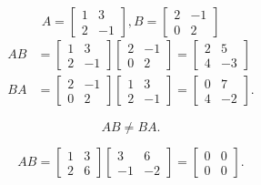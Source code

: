 \documentclass{article}
\begin{document}
\begin{example}
    \[
        A =
        \begin{bmatrix}
            1&3\\
            2&-1
        \end{bmatrix},
        B =
        \begin{bmatrix}
            2&-1\\
            0&2
        \end{bmatrix}
    \] 
    \begin{align*}
        AB &= 
        \begin{bmatrix}
            1&3\\
            2&-1
        \end{bmatrix}
        \begin{bmatrix}
            2&-1\\
            0&2
        \end{bmatrix}
        =
        \begin{bmatrix}
            2 & 5 \\
            4 & -3
        \end{bmatrix}\\
        BA &=
        \begin{bmatrix}
            2&-1\\
            0&2
        \end{bmatrix}
        \begin{bmatrix}
            1&3\\
            2&-1
        \end{bmatrix}
        =
        \begin{bmatrix}
            0&7\\
            4&-2
        \end{bmatrix}
    .\end{align*}
\end{example}

\begin{note}
    \[
        AB \neq BA
    .\] 
\end{note}

\hh\newpage

\begin{example}[$AB=0$ while $A \neq 0$ and $B\neq 0$]
    \[
        AB = 
        \begin{bmatrix} 1&3\\2&6 \end{bmatrix}
        \begin{bmatrix} 3&6\\-1&-2 \end{bmatrix} 
        =
        \begin{bmatrix} 0&0\\0&0 \end{bmatrix} 
    .\] 
\end{example}
\end{document}
